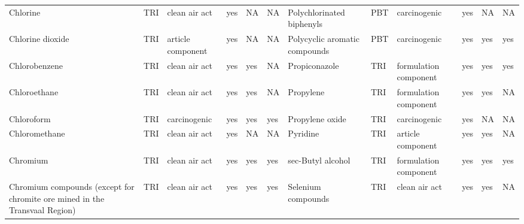 \begin{table}[H]
{\begin{tabular}{llllllllllll}
            Chlorine                                                                   & TRI            & clean air act         & yes    & NA      & NA   & Polychlorinated biphenyls                                                                                          & PBT            & carcinogenic          & yes & NA & NA\\
            Chlorine dioxide                                                           & TRI            & article component     & yes    & NA      & NA   & Polycyclic aromatic compounds                                                                                      & PBT & carcinogenic & yes & yes & yes\\
            Chlorobenzene                                                              & TRI            & clean air act         & yes    & yes     & NA   & Propiconazole                                                                                                      & TRI            & formulation component & yes & yes & yes\\
            Chloroethane                                                               & TRI            & clean air act         & yes    & yes     & NA   & Propylene                                                                                                          & TRI            & formulation component & yes & yes & NA\\
            Chloroform                                                                 & TRI            & carcinogenic          & yes    & yes     & yes  & Propylene oxide                                                                                                    & TRI            & carcinogenic          & yes    & NA      & NA   \\
            Chloromethane                                                              & TRI            & clean air act         & yes    & NA      & NA   & Pyridine                                                                                                           & TRI            & article component     & yes    & yes & NA\\
            Chromium                                                                   & TRI            & clean air act         & yes    & yes     & yes  & sec-Butyl alcohol                                                                                                  & TRI            & formulation component & yes & yes & yes\\
            Chromium compounds (except for chromite ore mined in the Transvaal Region) & TRI            & clean air act & yes & yes & yes & Selenium compounds & TRI & clean air act & yes & yes & NA\\

\end{tabular}}
\end{table}
